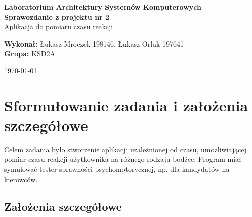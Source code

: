 \documentclass[12pt,a4paper]{article}
\begin{document}
\begin{titlepage}
    \centering
    \vspace*{2cm}
    {\Large \textbf{Laboratorium Architektury Systemów Komputerowych}} \\[1.5cm]
    {\Huge \textbf{Sprawozdanie z projektu nr 2}} \\[1cm]
    {\Large Aplikacja do pomiaru czasu reakcji} \\[3cm]
    \begin{flushleft}
        \textbf{Wykonał:} Łukasz Mroczek 198146, Łukasz Orluk 197641\\       
        \textbf{Grupa:} KSD2A\\
    \end{flushleft}
    \vfill
    {\large \today}
\end{titlepage}

\newpage
\tableofcontents

\newpage

\section{Sformułowanie zadania i założenia szczegółowe}

Celem zadania było stworzenie aplikacji uzależnionej od czasu, umożliwiającej pomiar czasu reakcji użytkownika na różnego rodzaju bodźce. Program miał symulować tester sprawności psychomotorycznej, np. dla kandydatów na kierowców.

\subsection{Założenia szczegółowe}
\end{document}

